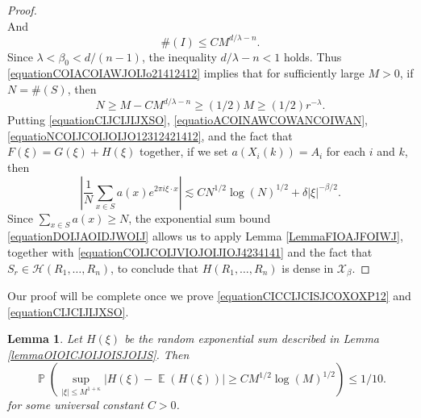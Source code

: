 \documentclass[dvipsnames,letterpaper,12pt]{article}
\numberwithin{equation}{section}
\newtheorem{lemma}[theorem]{Lemma}
\numberwithin{theorem}{section}
\DeclareMathOperator{\EE}{\mathbb{E}}
\DeclareMathOperator{\PP}{\mathbb{P}}
\begin{document}
\begin{proof}
\begin{equation}
    \end{equation}
    And
    \begin{equation} \label{equationCOIACOIAWJOIJo21412412}
        \#(I) \leq C M^{d/\lambda - n}.
    \end{equation}
    Since $\lambda < \beta_0 < d/(n-1)$, the inequality $d/\lambda - n < 1$ holds. Thus \eqref{equationCOIACOIAWJOIJo21412412} implies that for sufficiently large $M > 0$, if $N = \#(S)$, then
    \begin{equation} \label{equationCOIJCOIJVIOJOIJIOJ4234141}
        N \geq M - C M^{d/\lambda - n} \geq (1/2) M \geq (1/2) r^{-\lambda}.
    \end{equation}
    Putting \eqref{equationCIJCIJIJXSO}, \eqref{equatioACOINAWCOWANCOIWAN}, \eqref{equatioNCOIJCOIJOIJO12312421412}, and the fact that $F(\xi) = G(\xi) + H(\xi)$ together, if we set $a(X_i(k)) = A_i$ for each $i$ and $k$, then
    \begin{equation} \label{equationDOIJAOIDJWOIJ}
        \left| \frac{1}{N} \sum_{x \in S} a(x) e^{2 \pi i \xi \cdot x} \right| \lesssim C N^{1/2} \log(N)^{1/2} + \delta |\xi|^{-\beta/2}.
    \end{equation}
    Since $\sum_{x \in S} a(x) \geq N$, the exponential sum bound \eqref{equationDOIJAOIDJWOIJ} allows us to apply Lemma \ref{LemmaFIOAJFOIWJ}, together with \eqref{equationCOIJCOIJVIOJOIJIOJ4234141} and the fact that $S_r \in \mathcal{H}(R_1,\dots,R_n)$, to conclude that $H(R_1,\dots,R_n)$ is dense in $\mathcal{X}_\beta$.
\end{proof}

Our proof will be complete once we prove \eqref{equationCICCIJCISJCOXOXP12} and \eqref{equationCIJCIJIJXSO}.

\begin{lemma} \label{lemma24901401921209}
    Let $H(\xi)$ be the random exponential sum described in Lemma \ref{lemmaOIOICJOIJOISJOIJS}. Then
    \[ \PP \left( \sup_{|\xi| \leq M^{1 + \kappa}} | H(\xi) - \EE(H(\xi)) | \geq C M^{1/2} \log(M)^{1/2} \right) \leq 1/10. \]
    for some universal constant $C > 0$.
\end{lemma}

\end{document}

